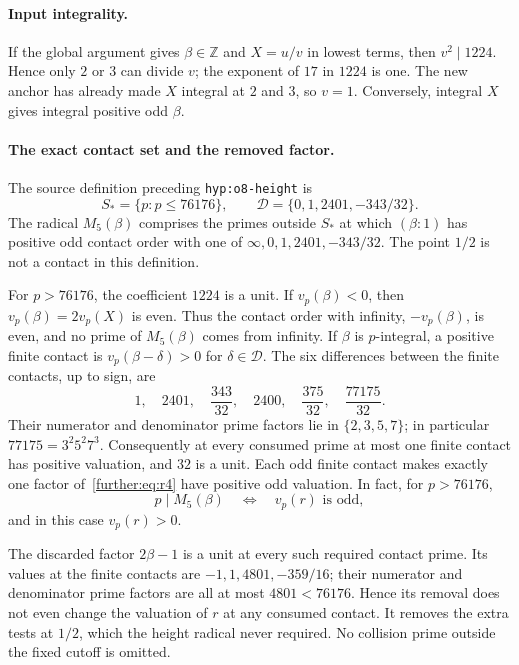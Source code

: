 \paragraph{Input integrality.}
If the global argument gives $\beta\in\mathbb Z$ and $X=u/v$ in
lowest terms, then $v^2\mid1224$. Hence only $2$ or $3$ can divide $v$;
the exponent of $17$ in $1224$ is one. The new anchor has already made
$X$ integral at $2$ and $3$, so $v=1$.
Conversely, integral $X$ gives integral positive odd $\beta$.

\paragraph{The exact contact set and the removed factor.}
The source definition preceding \nolinkurl{hyp:o8-height} is
\[
 S_* =\{p:p\le76176\},\qquad
 \mathcal D=\{0,1,2401,-343/32\}.
\]
The radical $M_5(\beta)$ comprises the primes outside $S_*$ at which
$(\beta:1)$ has positive odd contact order with one of
$\infty,0,1,2401,-343/32$. The point $1/2$ is not a contact in this
definition.

For $p>76176$, the coefficient $1224$ is a unit. If $v_p(\beta)<0$,
then $v_p(\beta)=2v_p(X)$ is even. Thus the contact order with infinity,
$-v_p(\beta)$, is even, and no prime of $M_5(\beta)$ comes from infinity.
If $\beta$ is $p$-integral, a positive finite contact is
$v_p(\beta-\delta)>0$ for $\delta\in\mathcal D$.
The six differences between the finite contacts, up to sign, are
\[
 1,\quad 2401,\quad \frac{343}{32},\quad
 2400,\quad\frac{375}{32},\quad\frac{77175}{32}.
\]
Their numerator and denominator prime factors lie in $\{2,3,5,7\}$;
in particular $77175=3^2 5^2 7^3$.
Consequently at every consumed prime at most one finite contact has
positive valuation, and $32$ is a unit. Each odd finite contact makes
exactly one factor of~\eqref{further:eq:r4} have positive odd valuation.
In fact, for $p>76176$,
\[
 p\mid M_5(\beta)
 \quad\Longleftrightarrow\quad v_p(r)\text{ is odd},
\]
and in this case $v_p(r)>0$.

The discarded factor $2\beta-1$ is a unit at every such required
contact prime. Its values at the finite contacts are
$-1,1,4801,-359/16$; their numerator and denominator prime factors are
all at most $4801<76176$. Hence its removal does not even change the
valuation of $r$ at any consumed contact. It removes the extra tests
at $1/2$, which the height radical never required. No collision prime
outside the fixed cutoff is omitted.

